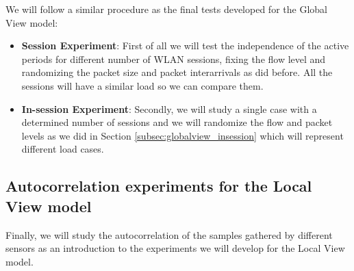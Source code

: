 We will follow a similar procedure as the final tests developed for the Global View model: 

\begin{itemize}
	\item \textbf{Session Experiment}: First of all we will test the independence of the active periods for different number of \acs{WLAN} sessions, fixing the flow level and randomizing the packet size and packet interarrivals as did before. All the sessions will have a similar load so we can compare them.
	\item \textbf{In-session Experiment}: Secondly, we will study a single case with a determined number of sessions and we will randomize the flow and packet levels as we did in Section \ref{subsec:globalview_insession} which will represent different load cases.
\end{itemize}



\subsection{Autocorrelation experiments for the Local View model} \label{subsec:autocorrelation_lv}
Finally, we will study the autocorrelation of the samples gathered by different sensors as an introduction to the experiments we will develop for the Local View model.

